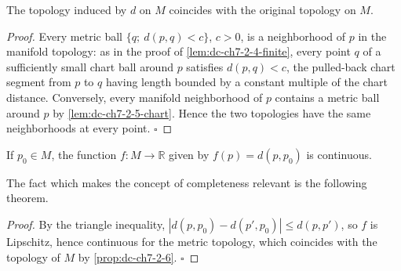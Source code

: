 \begin{proposition}
  \label{prop:dc-ch7-2-6}
  \mathlibok
  The topology induced by $d$ on $M$ coincides with the original topology on $M$.
\end{proposition}
\begin{proof}
  Every metric ball $\{q;\ d(p,q)<c\}$, $c>0$, is a neighborhood of $p$ in the
  manifold topology: as in the proof of \cref{lem:dc-ch7-2-4-finite}, every
  point $q$ of a sufficiently small chart ball around $p$ satisfies
  $d(p,q)<c$, the pulled-back chart segment from $p$ to $q$ having length
  bounded by a constant multiple of the chart distance. Conversely, every
  manifold neighborhood of $p$ contains a metric ball around $p$ by
  \cref{lem:dc-ch7-2-5-chart}. Hence the two topologies have the same
  neighborhoods at every point. $\square$
\end{proof}

\begin{corollary}
  \label{cor:dc-ch7-2-7}
  \leanok
  If $p_0\in M$, the function $f:M\to\mathbb{R}$ given by $f(p)=d(p,p_0)$ is
  continuous.

  The fact which makes the concept of completeness relevant is the following
  theorem.
\end{corollary}
\begin{proof}
  \leanok
  By the triangle inequality, $|d(p,p_0)-d(p',p_0)|\le d(p,p')$, so $f$ is
  Lipschitz, hence continuous for the metric topology, which coincides with
  the topology of $M$ by \cref{prop:dc-ch7-2-6}. $\square$
\end{proof}

